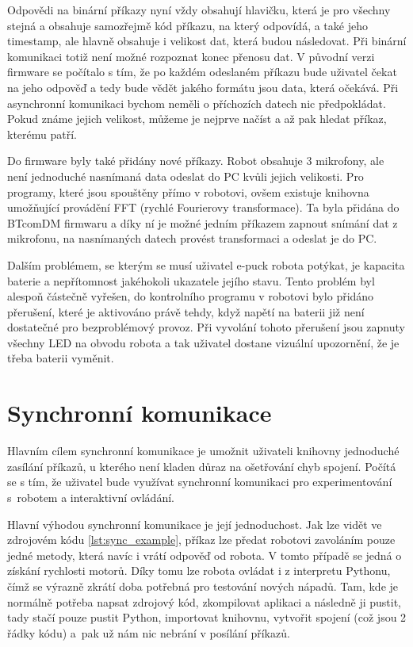     Odpovědi na binární příkazy nyní vždy obsahují hlavičku, která je pro
    všechny stejná a obsahuje samozřejmě kód příkazu, na který odpovídá, a také
    jeho timestamp, ale hlavně obsahuje i velikost dat, která budou následovat.
    Při binární komunikaci totiž není možné rozpoznat konec přenosu dat. V
    původní verzi firmware se počítalo s tím, že po každém odeslaném příkazu
    bude uživatel čekat na jeho odpověď a tedy bude vědět jakého formátu jsou
    data, která očekává. Při asynchronní komunikaci bychom neměli o příchozích
    datech nic předpokládat. Pokud známe jejich velikost, můžeme je nejprve
    načíst a až pak hledat příkaz, kterému patří.

    Do firmware byly také přidány nové příkazy. Robot obsahuje 3 mikrofony, ale
    není jednoduché nasnímaná data odeslat do PC kvůli jejich velikosti. Pro
    programy, které jsou spouštěny přímo v robotovi, ovšem existuje knihovna
    umožňující provádění FFT (rychlé Fourierovy transformace). Ta byla přidána
    do BTcomDM firmwaru a díky ní je možné jedním příkazem zapnout snímání dat
    z mikrofonu, na nasnímaných datech provést transformaci a odeslat je do PC.

    Dalším problémem, se kterým se musí uživatel e-puck robota potýkat, je
    kapacita baterie a nepřítomnost jakéhokoli ukazatele jejího stavu. Tento
    problém byl alespoň částečně vyřešen, do kontrolního programu v robotovi
    bylo přidáno přerušení, které je aktivováno právě tehdy, když napětí na
    baterii již není dostatečné pro bezproblémový provoz. Při vyvolání tohoto
    přerušení jsou zapnuty všechny LED na obvodu robota a tak uživatel dostane
    vizuální upozornění, že je třeba baterii vyměnit.

    \section{Synchronní komunikace}
    \label{btcom:sync}

    Hlavním cílem synchronní komunikace je umožnit uživateli knihovny
    jednoduché zasílání příkazů, u kterého není kladen důraz na ošetřování chyb
    spojení. Počítá se s tím, že uživatel bude využívat synchronní komunikaci
    pro experimentování s~robotem a interaktivní ovládání.

    Hlavní výhodou synchronní komunikace je její jednoduchost. Jak lze vidět
    ve zdrojovém kódu \ref{lst:sync_example}, příkaz lze předat robotovi
    zavoláním pouze jedné metody, která navíc i vrátí odpověď od robota. V
    tomto případě se jedná o získání rychlosti motorů. Díky tomu lze robota
    ovládat i z interpretu Pythonu, čímž se výrazně zkrátí doba potřebná pro
    testování nových nápadů. Tam, kde je normálně potřeba napsat zdrojový kód,
    zkompilovat aplikaci a následně ji pustit, tady stačí pouze pustit Python,
    importovat knihovnu, vytvořit spojení (což jsou 2 řádky kódu) a~pak už nám
    nic nebrání v posílání příkazů.

